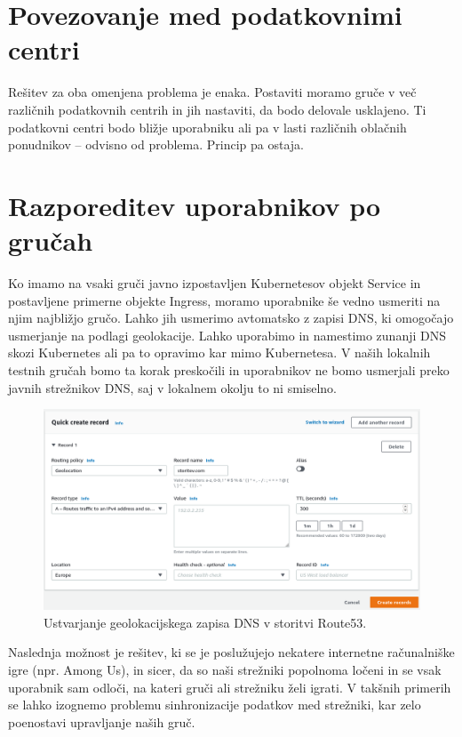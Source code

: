 \documentclass[a4paper, 12pt]{book}
\begin{document}
\section{Povezovanje med podatkovnimi centri}
Rešitev za oba omenjena problema je enaka.
Postaviti moramo gruče v več različnih podatkovnih centrih in jih nastaviti, da bodo delovale usklajeno.
Ti podatkovni centri bodo bližje uporabniku ali pa v lasti različnih oblačnih ponudnikov -- odvisno od problema.
  Princip pa ostaja.
\section{Razporeditev uporabnikov po gručah}
Ko imamo na vsaki gruči javno izpostavljen Kubernetesov objekt Service in postavljene primerne objekte Ingress, moramo uporabnike še vedno usmeriti na njim najbližjo gručo.
Lahko jih usmerimo avtomatsko z zapisi DNS, ki omogočajo usmerjanje na podlagi geolokacije.
Lahko uporabimo in namestimo zunanji DNS skozi Kubernetes ali pa to opravimo kar mimo Kubernetesa.
V naših lokalnih testnih gručah bomo ta korak preskočili in uporabnikov ne bomo usmerjali preko javnih strežnikov DNS, saj v lokalnem okolju to ni smiselno.
\begin{figure}[h]
\begin{center}
\includegraphics[width=1.0\textwidth]{images/geolokacijski-dns.png}
\end{center}
  \caption{Ustvarjanje geolokacijskega zapisa DNS v storitvi Route53.}
\label{primer-ustvarjanje-geolokacijskega-zapisa}
\end{figure}

Naslednja možnost je rešitev, ki se je poslužujejo nekatere internetne računalniške igre (npr. Among Us), in sicer, da so naši strežniki popolnoma ločeni in se vsak uporabnik sam odloči, na kateri gruči ali strežniku želi igrati.
V takšnih primerih se lahko izognemo problemu sinhronizacije podatkov med strežniki, kar zelo poenostavi upravljanje naših gruč.
\end{document}

